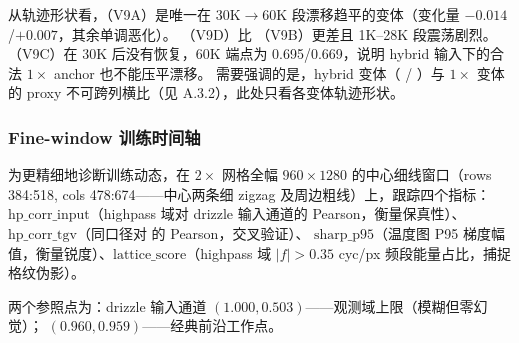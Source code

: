 \begin{table}[ht]
  \centering
  \caption{各变体真实数据 eval 漂移轨迹（artifact / corr）}
  \label{tab:drift-archive}
  \small
\end{table}

从轨迹形状看，（V9A）是唯一在 30K\(\rightarrow\)60K 段漂移趋平的变体（变化量 \(-0.014\)/\(+0.007\)，其余单调恶化）。
（V9D）比 （V9B）更差且 1K--28K 段震荡剧烈。
（V9C）在 30K 后没有恢复，60K 端点为 0.695/0.669，说明 hybrid 输入下的合法 \(1\times\) anchor 也不能压平漂移。
需要强调的是，hybrid 变体（ / ）与 \(1\times\) 变体的 proxy 不可跨列横比（见 A.3.2），此处只看各变体轨迹形状。

\subsubsection{Fine-window 训练时间轴}

为更精细地诊断训练动态，在 \(2\times\) 网格全幅 \(960 \times 1280\) 的中心细线窗口（rows 384:518, cols 478:674——中心两条细 zigzag 及周边粗线）上，跟踪四个指标：
\(\text{hp\_corr\_input}\)（highpass 域对 drizzle 输入通道的 Pearson，衡量保真性）、\(\text{hp\_corr\_tgv}\)（同口径对  的 Pearson，交叉验证）、
\(\text{sharp\_p95}\)（温度图 P95 梯度幅值，衡量锐度）、\(\text{lattice\_score}\)（highpass 域 \(|f| > 0.35\) cyc/px 频段能量占比，捕捉格纹伪影）。

两个参照点为：drizzle 输入通道 \((1.000, 0.503)\)——观测域上限（模糊但零幻觉）； \((0.960, 0.959)\)——经典前沿工作点。

